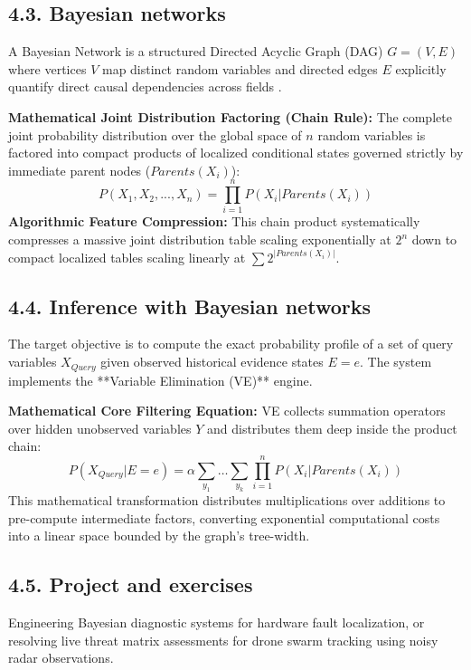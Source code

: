 \documentclass[11pt,a4paper]{article}
\begin{document}
\subsection{4.3. Bayesian networks}
A Bayesian Network is a structured Directed Acyclic Graph (DAG) $G=(V,E)$ where vertices $V$ map distinct random variables and directed edges $E$ explicitly quantify direct causal dependencies across fields \cite{mutzari2025defending}.

\textbf{Mathematical Joint Distribution Factoring (Chain Rule):} The complete joint probability distribution over the global space of $n$ random variables is factored into compact products of localized conditional states governed strictly by immediate parent nodes ($Parents(X_i)$):
\begin{equation}
    P(X_1, X_2, ..., X_n) = \prod_{i=1}^{n} P(X_i | Parents(X_i))
\end{equation}
\textbf{Algorithmic Feature Compression:} This chain product systematically compresses a massive joint distribution table scaling exponentially at $2^n$ down to compact localized tables scaling linearly at $\sum 2^{|Parents(X_i)|}$.

\subsection{4.4. Inference with Bayesian networks}
The target objective is to compute the exact probability profile of a set of query variables $X_{Query}$ given observed historical evidence states $E = e$. The system implements the **Variable Elimination (VE)** engine.

\textbf{Mathematical Core Filtering Equation:} VE collects summation operators over hidden unobserved variables $Y$ and distributes them deep inside the product chain:
\begin{equation}
    P(X_{Query} | E = e) = \alpha \sum_{y_1} \dots \sum_{y_k} \prod_{i=1}^{n} P(X_i | Parents(X_i))
\end{equation}
This mathematical transformation distributes multiplications over additions to pre-compute intermediate factors, converting exponential computational costs into a linear space bounded by the graph's tree-width.

\subsection{4.5. Project and exercises}
Engineering Bayesian diagnostic systems for hardware fault localization, or resolving live threat matrix assessments for drone swarm tracking using noisy radar observations.
\end{document}
